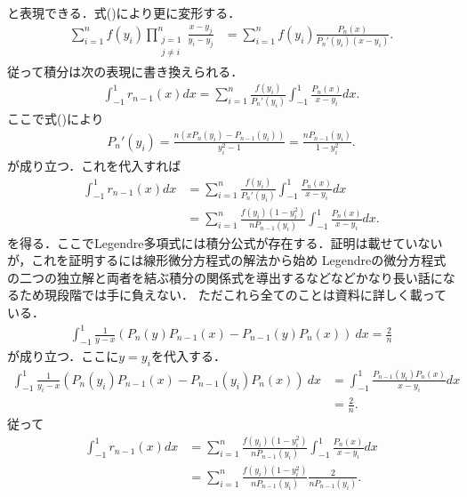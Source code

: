 \documentclass[a4j,papersize,disablejfam,slide,14pt]{jsarticle}
\begin{document}
    と表現できる．式()により更に変形する．
    \begin{align}
    	\sum_{i=1}^{n} f(y_i) \prod_{\substack{j=1 \\ j \neq i}}^{n} \frac{x-y_j}{y_i - y_j}
        &= \sum_{i=1}^{n} f(y_i) \frac{P_n(x)}{P_n'(y_i) (x - y_i)}.
    \end{align}
    従って積分は次の表現に書き換えられる．
    \begin{align}
    	\int_{-1}^{1} r_{n-1}(x) dx = \sum_{i=1}^{n} \frac{f(y_i)}{P_n'(y_i)} \int_{-1}^{1} \frac{P_n(x)}{x-y_i} dx.
    \end{align}
    ここで式()により
    \begin{align}
    	P_n'(y_i) = \frac{n\left( xP_n(y_i) - P_{n-1}(y_i) \right)}{y_i^2 - 1} = \frac{nP_{n-1}(y_i)}{1-y_i^2}.
    \end{align}
    が成り立つ．これを代入すれば
    \begin{align}
    	\int_{-1}^{1} r_{n-1}(x) dx &= \sum_{i=1}^{n} \frac{f(y_i)}{P_n'(y_i)} \int_{-1}^{1} \frac{P_n(x)}{x-y_i} dx \\
        &= \sum_{i=1}^{n} \frac{f(y_i) (1-y_i^2)}{nP_{n-1}(y_i)} \int_{-1}^{1} \frac{P_n(x)}{x-y_i} dx.
    \end{align}
    を得る．ここで{\rm Legendre}多項式には積分公式が存在する．証明は載せていないが，これを証明するには線形微分方程式の解法から始め
    {\rm Legendre}の微分方程式の二つの独立解と両者を結ぶ積分の関係式を導出するなどなどかなり長い話になるため現段階では手に負えない．
    ただこれら全てのことは資料\cite{terakan}に詳しく載っている．
    \begin{align}
    	\int_{-1}^{1} \frac{1}{y - x} \left( P_n(y) P_{n-1}(x) - P_{n-1} (y) P_n(x) \right)\ dx = \frac{2}{n}
    \end{align}
    が成り立つ．ここに$y = y_i$を代入する．
    \begin{align}
    	\int_{-1}^{1} \frac{1}{y_i - x} \left( P_n(y_i) P_{n-1}(x) - P_{n-1} (y_i) P_n(x) \right)\ dx
        &= \int_{-1}^{1} \frac{P_{n-1} (y_i) P_n(x)}{x - y_i} dx \\
        &= \frac{2}{n}.
    \end{align}
    従って
    \begin{align}
    	\int_{-1}^{1} r_{n-1}(x) dx &= \sum_{i=1}^{n} \frac{f(y_i) (1-y_i^2)}{nP_{n-1}(y_i)} \int_{-1}^{1} \frac{P_n(x)}{x-y_i} dx \\
        &= \sum_{i=1}^{n} \frac{f(y_i) (1-y_i^2)}{nP_{n-1}(y_i)} \frac{2}{n P_{n-1} (y_i)}.
    \end{align}
\end{document}

